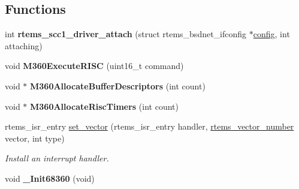 \subsection*{Functions}
\begin{DoxyCompactItemize}
\item 
\mbox{\label{group__RTEMSBSPsM68kGen68360_ga9e26906565bf4f1a75e8344267ec0eec}} 
int {\bfseries rtems\+\_\+scc1\+\_\+driver\+\_\+attach} (struct rtems\+\_\+bsdnet\+\_\+ifconfig $\ast$\mbox{\hyperlink{structconfig__s}{config}}, int attaching)
\item 
\mbox{\label{group__RTEMSBSPsM68kGen68360_gac72e74ad17b7bbc3a8fad80e658e210b}} 
void {\bfseries M360\+Execute\+R\+I\+SC} (uint16\+\_\+t command)
\item 
\mbox{\label{group__RTEMSBSPsM68kGen68360_gaa631552874a6308b8d3b6826669f1574}} 
void $\ast$ {\bfseries M360\+Allocate\+Buffer\+Descriptors} (int count)
\item 
\mbox{\label{group__RTEMSBSPsM68kGen68360_gaa5df737e3f41e88e1f58af0da6cf97c6}} 
void $\ast$ {\bfseries M360\+Allocate\+Risc\+Timers} (int count)
\item 
rtems\+\_\+isr\+\_\+entry \mbox{\hyperlink{group__RTEMSBSPsM68kGen68360_gab3388042c56b34c40be81fd5f028d97e}{set\+\_\+vector}} (rtems\+\_\+isr\+\_\+entry handler, \mbox{\hyperlink{group__ClassicINTR_ga3e434c197d99f128e78cae4d9358bd8b}{rtems\+\_\+vector\+\_\+number}} vector, int type)
\begin{DoxyCompactList}\small\item\em Install an interrupt handler. \end{DoxyCompactList}\item 
\mbox{\label{group__RTEMSBSPsM68kGen68360_ga35909b525441e35d1e31ea93d5892988}} 
void {\bfseries \+\_\+\+Init68360} (void)
\end{DoxyCompactItemize}
